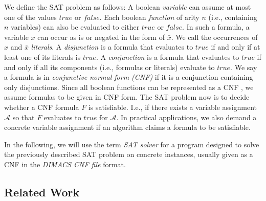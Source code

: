 \documentclass[12pt,a4paper,twoside]{scrartcl}
\numberwithin{equation}{section}
\begin{document}
We define the SAT problem as follows:
A boolean \textit{variable} can assume at most one of the values $true$ or $false$. Each boolean \textit{function} of arity $n$ (i.e., containing $n$ variables) can also be evaluated to either $true$ or $false$. In such a formula, a variable $x$ can occur as is or negated in the form of $\bar{x}$. We call the occurrences of $x$ and $\bar{x}$ \textit{literals}. A \textit{disjunction} is a formula that evaluates to $true$ if and only if at least one of its literals is $true$. A \textit{conjunction} is a formula that evaluates to $true$ if and only if all its components (i.e., formulas or literals) evaluate to $true$. We say a formula is in \textit{conjunctive normal form (CNF)} if it is a conjunction containing only disjunctions. Since all boolean functions can be represented as a CNF \cite{cnfPaper}, we assume formulas to be given in CNF form. 
The SAT problem now is to decide whether a CNF formula $F$ is satisfiable. I.e., if there exists a variable assignment $\mathcal{A}$ so that $F$ evaluates to $true$ for $\mathcal{A}$. In practical applications, we also demand a concrete variable assignment if an algorithm claims a formula to be satisfiable.

In the following, we will use the term \textit{SAT solver} for a program designed to solve the previously described SAT problem on concrete instances, usually given as a CNF in the \textit{DIMACS CNF file} format.

\subsection{Related Work}
\label{sec:relatedWork}
\end{document}
